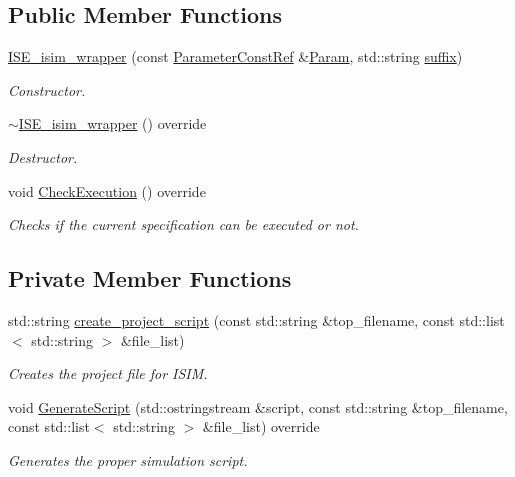 \subsection*{Public Member Functions}
\begin{DoxyCompactItemize}
\item 
\hyperlink{classISE__isim__wrapper_a7a45e55d837ba7c7c24cc7db77bc529c}{I\+S\+E\+\_\+isim\+\_\+wrapper} (const \hyperlink{Parameter_8hpp_a37841774a6fcb479b597fdf8955eb4ea}{Parameter\+Const\+Ref} \&\hyperlink{classSimulationTool_adc409fd8f18901e2d0ea4a6ab6690138}{Param}, std\+::string \hyperlink{classISE__isim__wrapper_a372513ac46467fd73931d3798ad75e1b}{suffix})
\begin{DoxyCompactList}\small\item\em Constructor. \end{DoxyCompactList}\item 
\hyperlink{classISE__isim__wrapper_ad3813f02064fe3ccccbc42dac0e8c8d2}{$\sim$\+I\+S\+E\+\_\+isim\+\_\+wrapper} () override
\begin{DoxyCompactList}\small\item\em Destructor. \end{DoxyCompactList}\item 
void \hyperlink{classISE__isim__wrapper_ab7b4139eab5055486945c1547569276f}{Check\+Execution} () override
\begin{DoxyCompactList}\small\item\em Checks if the current specification can be executed or not. \end{DoxyCompactList}\end{DoxyCompactItemize}
\subsection*{Private Member Functions}
\begin{DoxyCompactItemize}
\item 
std\+::string \hyperlink{classISE__isim__wrapper_a3c70d0ac9c358331df4e9519db77c2f8}{create\+\_\+project\+\_\+script} (const std\+::string \&top\+\_\+filename, const std\+::list$<$ std\+::string $>$ \&file\+\_\+list)
\begin{DoxyCompactList}\small\item\em Creates the project file for I\+S\+IM. \end{DoxyCompactList}\item 
void \hyperlink{classISE__isim__wrapper_a7f67c0aa82f1959d7327f05cb4504477}{Generate\+Script} (std\+::ostringstream \&script, const std\+::string \&top\+\_\+filename, const std\+::list$<$ std\+::string $>$ \&file\+\_\+list) override
\begin{DoxyCompactList}\small\item\em Generates the proper simulation script. \end{DoxyCompactList}\end{DoxyCompactItemize}
